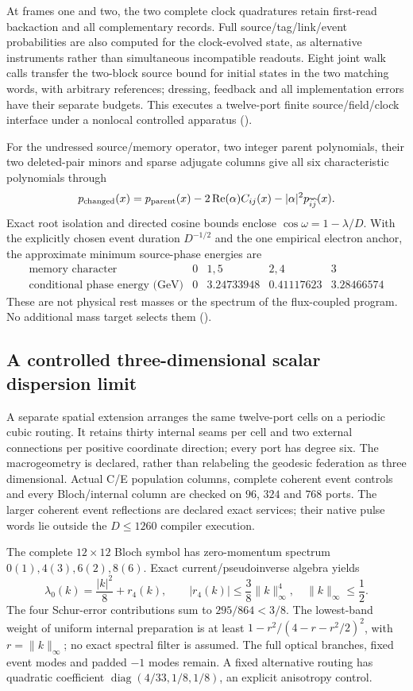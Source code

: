 At frames one and two, the two complete clock quadratures retain first-read
backaction and all complementary records. Full source/tag/link/event
probabilities are also computed for the clock-evolved state, as alternative
instruments rather than simultaneous incompatible readouts. Eight joint
walk calls transfer the two-block source bound for initial states in the
two matching words, with arbitrary references; dressing, feedback and all
implementation errors have their separate budgets. This executes a twelve-port
finite source/field/clock interface under a nonlocal controlled apparatus
().

For the undressed source/memory operator, two integer parent polynomials,
their two deleted-pair minors and sparse adjugate columns give all six
characteristic polynomials through
\[
 p_{\rm changed}(x)=p_{\rm parent}(x)
 -2\operatorname{Re}(\alpha)C_{ij}(x)-|\alpha|^2p_{\widehat i\widehat j}(x).
\]
Exact root isolation and directed cosine bounds enclose
$\cos\omega=1-\lambda/D$. With the explicitly chosen event duration
$D^{-1/2}$ and the one empirical electron anchor, the approximate minimum
source-phase energies are
\[
\begin{array}{c|cccc}
\text{memory character}&0&1,5&2,4&3\\\hline
\text{conditional phase energy (GeV)}&0&3.24733948&0.41117623&3.28466574
\end{array}
\]
These are not physical rest masses or the spectrum of the flux-coupled
program. No additional mass target selects them
().

\subsection{A controlled three-dimensional scalar dispersion limit}

A separate spatial extension arranges the same twelve-port cells on a
periodic cubic routing. It retains thirty internal seams per cell and two
external connections per positive coordinate direction; every port has
degree six. The macrogeometry is declared, rather than relabeling the
geodesic federation as three dimensional. Actual C/E population columns,
complete coherent event controls and every Bloch/internal column are
checked on $96$, $324$ and $768$ ports. The larger coherent event reflections
are declared exact services; their native pulse words lie outside
the $D\le1260$ compiler execution.

The complete $12\times12$ Bloch symbol has zero-momentum spectrum
$0(1),4(3),6(2),8(6)$. Exact current/pseudoinverse algebra yields
\[
 \lambda_0(k)=\frac{|k|^2}{8}+r_4(k),\qquad
 |r_4(k)|\le\frac38\|k\|_\infty^4,
 \quad\|k\|_\infty\le\frac12.
\]
The four Schur-error contributions sum to $295/864<3/8$. The lowest-band
weight of uniform internal preparation is at least
$1-r^2/(4-r-r^2/2)^2$, with $r=\|k\|_\infty$; no exact spectral filter is
assumed. The full optical branches, fixed event modes and padded $-1$
modes remain. A fixed alternative routing has quadratic coefficient
$\operatorname{diag}(4/33,1/8,1/8)$, an explicit anisotropy control.

